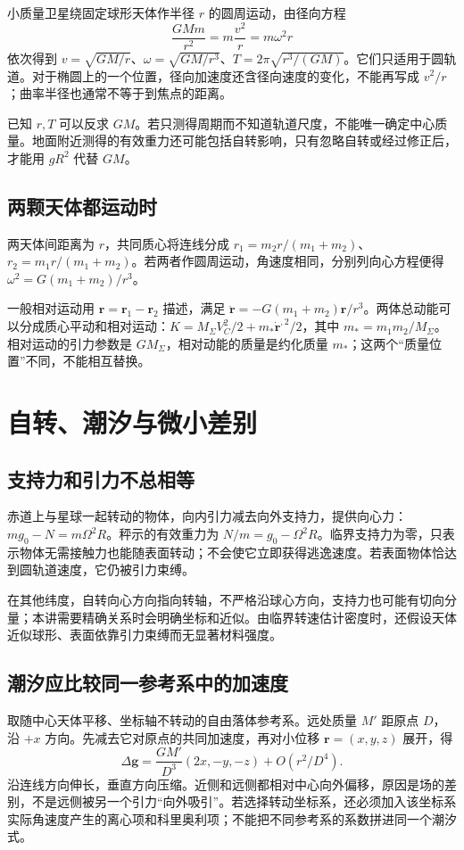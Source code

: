 小质量卫星绕固定球形天体作半径 $r$ 的圆周运动，由径向方程
\[
 \frac{GMm}{r^2}=m\frac{v^2}{r}=m\omega^2r
\]
依次得到 $v=\sqrt{GM/r}$、$\omega=\sqrt{GM/r^3}$、$T=2\pi\sqrt{r^3/(GM)}$。它们只适用于圆轨道。对于椭圆上的一个位置，径向加速度还含径向速度的变化，不能再写成 $v^2/r$；曲率半径也通常不等于到焦点的距离。

已知 $r,T$ 可以反求 $GM$。若只测得周期而不知道轨道尺度，不能唯一确定中心质量。地面附近测得的有效重力还可能包括自转影响，只有忽略自转或经过修正后，才能用 $gR^2$ 代替 $GM$。

\subsection{两颗天体都运动时}

两天体间距离为 $r$，共同质心将连线分成 $r_1=m_2r/(m_1+m_2)$、$r_2=m_1r/(m_1+m_2)$。若两者作圆周运动，角速度相同，分别列向心方程便得 $\omega^2=G(m_1+m_2)/r^3$。

一般相对运动用 $\bm r=\bm r_1-\bm r_2$ 描述，满足 $\ddot{\bm r}=-G(m_1+m_2)\bm r/r^3$。两体总动能可以分成质心平动和相对运动：$K=M_{\Sigma}V_C^2/2+m_*\dot{\bm r}^{,2}/2$，其中 $m_*=m_1m_2/M_{\Sigma}$。相对运动的引力参数是 $GM_{\Sigma}$，相对动能的质量是约化质量 $m_*$；这两个“质量位置”不同，不能相互替换。


\section{自转、潮汐与微小差别}
\subsection{支持力和引力不总相等}

赤道上与星球一起转动的物体，向内引力减去向外支持力，提供向心力：$mg_0-N=m\Omega^2R$。秤示的有效重力为 $N/m=g_0-\Omega^2R$。临界支持力为零，只表示物体无需接触力也能随表面转动；不会使它立即获得逃逸速度。若表面物体恰达到圆轨道速度，它仍被引力束缚。

在其他纬度，自转向心方向指向转轴，不严格沿球心方向，支持力也可能有切向分量；本讲需要精确关系时会明确坐标和近似。由临界转速估计密度时，还假设天体近似球形、表面依靠引力束缚而无显著材料强度。

\subsection{潮汐应比较同一参考系中的加速度}

取随中心天体平移、坐标轴不转动的自由落体参考系。远处质量 $M'$ 距原点 $D$，沿 $+x$ 方向。先减去它对原点的共同加速度，再对小位移 $\bm r=(x,y,z)$ 展开，得
\[
 \Delta\bm g=\frac{GM'}{D^3}(2x,-y,-z)+O(r^2/D^4).
\]
沿连线方向伸长，垂直方向压缩。近侧和远侧都相对中心向外偏移，原因是场的差别，不是远侧被另一个引力“向外吸引”。若选择转动坐标系，还必须加入该坐标系实际角速度产生的离心项和科里奥利项；不能把不同参考系的系数拼进同一个潮汐式。


